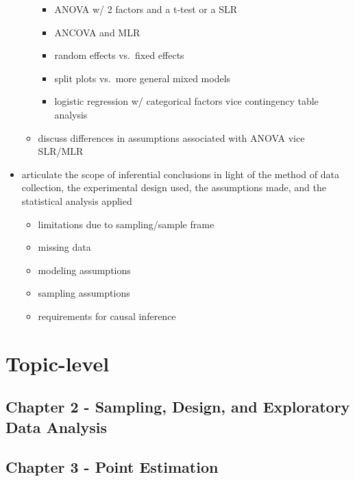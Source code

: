 \documentclass[
]{book}
\providecommand{\tightlist}{%
  \setlength{\itemsep}{0pt}\setlength{\parskip}{0pt}}
\theoremstyle{definition}
\theoremstyle{definition}
\theoremstyle{definition}
\theoremstyle{remark}
\begin{document}
\begin{itemize}
\begin{itemize}
    \begin{itemize}
    \tightlist
    \item
      ANOVA w/ 2 factors and a t-test or a SLR
    \item
      ANCOVA and MLR
    \item
      random effects vs.~fixed effects
    \item
      split plots vs.~more general mixed models
    \item
      logistic regression w/ categorical factors vice contingency table analysis
    \end{itemize}
  \item
    discuss differences in assumptions associated with ANOVA vice SLR/MLR
  \end{itemize}
\item
  articulate the scope of inferential conclusions in light of the method of data collection, the experimental design used, the assumptions made, and the statistical analysis applied

  \begin{itemize}
  \tightlist
  \item
    limitations due to sampling/sample frame
  \item
    missing data
  \item
    modeling assumptions
  \item
    sampling assumptions
  \item
    requirements for causal inference
  \end{itemize}
\end{itemize}

\hypertarget{topic-level}{%
\section{Topic-level}\label{topic-level}}

\hypertarget{chapter-2---sampling-design-and-exploratory-data-analysis}{%
\subsection{Chapter 2 - Sampling, Design, and Exploratory Data Analysis}\label{chapter-2---sampling-design-and-exploratory-data-analysis}}

\hypertarget{chapter-3---point-estimation}{%
\subsection{Chapter 3 - Point Estimation}\label{chapter-3---point-estimation}}
\end{document}
